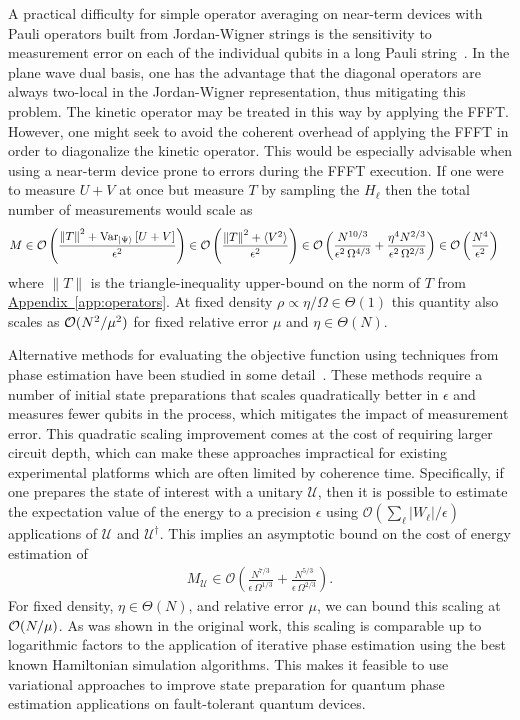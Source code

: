 \documentclass[superscriptaddress,aps,pra,nofootinbib,notitlepage,10pt,longbibliography]{revtex4-1}
\DeclareRobustCommand{\app}[1]{\hyperref[app:#1]{Appendix~\ref*{app:#1}}}
\def\avg#1{\mathinner{\langle{#1}\rangle}}
\def\ket#1{\mathinner{|{#1}\rangle}}
\begin{document}
A practical difficulty for simple operator averaging on near-term devices with Pauli operators built from Jordan-Wigner strings is the sensitivity to measurement error on each of the individual qubits in a long Pauli string~\cite{Kandala2017}.  In the plane wave dual basis, one has the advantage that the diagonal operators are always two-local in the Jordan-Wigner representation, thus mitigating this problem. The kinetic operator may be treated in this way by applying the FFFT. However, one might seek to avoid the coherent overhead of applying the FFFT in order to diagonalize the kinetic operator. This would be especially advisable when using a near-term device prone to errors during the FFFT execution. If one were to measure $U + V$ at once but measure $T$ by sampling the $H_\ell$ then the total number of measurements would scale as
\begin{align}
\label{eq:practical_measure}
M & \in {\cal O}\left(\frac{\left \| T \right\|^2 + \text{Var}_{\ket{\Psi}}\left[U + V\right]}{\epsilon^2}\right) 
%
\in {\cal O}\left(\frac{\left \| T \right\|^2 + \avg{V^2}}{\epsilon^2}\right) \in {\cal O}\left(\frac{N^{10/3}}{\epsilon^2 \, \Omega^{4/3}} + \frac{\eta^4 N^{2/3}}{\epsilon^2 \, \Omega^{2/3}}\right) \in {\cal O}\left(\frac{N^4}{\epsilon^2}\right)\nonumber
\end{align}
where $\| T \|$ is the triangle-inequality upper-bound on the norm of $T$ from \app{operators}. At fixed density $\rho \propto \eta / \Omega \in \Theta(1)$ this quantity also scales as ${\cal O}(N^2 / \mu^2)$ for fixed relative error $\mu$ and $\eta \in \Theta(N)$.

Alternative methods for evaluating the objective function using techniques from phase estimation have been studied in some detail~\cite{Santagati2016}. These methods require a number of initial state preparations that scales quadratically better in $\epsilon$ and measures fewer qubits in the process, which mitigates the impact of measurement error. This quadratic scaling improvement comes at the cost of requiring larger circuit depth, which can make these approaches impractical for existing experimental platforms which are often limited by coherence time. Specifically, if one prepares the state of interest with a unitary $\mathcal{U}$, then it is possible to estimate the expectation value of the energy to a precision $\epsilon$ using $\mathcal{O}(\sum_\ell |W_\ell| / \epsilon)$ applications of $\mathcal{U}$ and $\mathcal{U}^\dagger$.  This implies an asymptotic bound on the cost of energy estimation of
\begin{align}
M_{\mathcal{U}} \in \mathcal{O} \left(\frac{N^{7/3}}{\epsilon \, \Omega^{1/3}} + \frac{N^{5/3}}{\epsilon \, \Omega^{2/3}} \right).
\end{align}
For fixed density, $\eta \in \Theta(N)$, and relative error $\mu$, we can bound this scaling at ${\cal O}(N/\mu)$. As was shown in the original work, this scaling is comparable up to logarithmic factors to the application of iterative phase estimation using the best known Hamiltonian simulation algorithms.  This makes it feasible to use variational approaches to improve state preparation for quantum phase estimation applications on fault-tolerant quantum devices.
\end{document}
